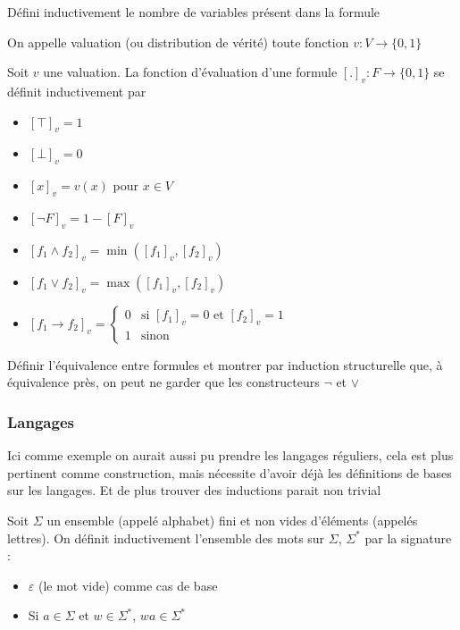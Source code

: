 \begin{exercise}
	Défini inductivement le nombre de variables présent dans la formule
\end{exercise}

\begin{definition}
	On appelle valuation (ou distribution de vérité) toute fonction $v : V \to \{0, 1\}$
\end{definition}

\begin{definition} Soit $v$ une valuation. La fonction d'évaluation d'une formule $[.]_v : F \to \{0,1\}$ se définit inductivement par \begin{itemize}[label=$\bullet$]
		\item $[\top]_v = 1$
		\item $[\bot]_v = 0$
		\item $[x]_v = v(x)$ pour $x \in V$
		\item $[\neg F]_v = 1 - [F]_v$
		\item $[f_1 \wedge f_2]_v = \min([f_1]_v, [f_2]_v)$
		\item $[f_1 \vee f_2]_v = \max([f_1]_v, [f_2]_v)$
		\item $[f_1 \to f_2]_v = \left\{ \begin{array}{ll}
			0 & \text{si } [f_1]_v = 0 \text{ et } [f_2]_v = 1\\
			1 & \text{sinon}
		\end{array} \right.$
\end{itemize}
\end{definition}

\begin{exercise}
	Définir l'équivalence entre formules et montrer par induction structurelle que, à équivalence près, on peut ne garder que les constructeurs $\neg$ et $\vee$
\end{exercise}

\subsubsection{Langages}

\begin{com}
	Ici comme exemple on aurait aussi pu prendre les langages réguliers, cela est plus pertinent comme construction, mais nécessite d'avoir déjà les définitions de bases sur les langages. Et de plus trouver des inductions parait non trivial
\end{com}

\begin{definition}
	Soit $\Sigma$ un ensemble (appelé alphabet) fini et non vides d'éléments (appelés lettres). On définit inductivement l'ensemble des mots sur $\Sigma$, $\Sigma^*$ par la signature : \begin{itemize}
		\item $\varepsilon$ (le mot vide) comme cas de base
		\item Si $a \in \Sigma$ et $w \in \Sigma^*$, $wa\in \Sigma^*$
	\end{itemize}
\end{definition}

